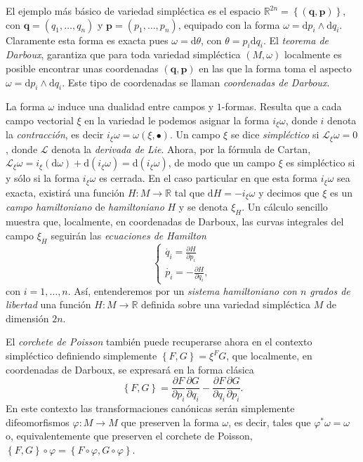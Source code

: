 \documentclass[12pt,a4paper,twoside]{article}
\theoremstyle{definition} \newtheorem{defn}[thm]{Definición}
\theoremstyle{definition} \newtheorem{ejemplo}[thm]{Ejemplo}
\theoremstyle{definition} \newtheorem{ejercicio}[thm]{Ejercicio}
\theoremstyle{remark} \newtheorem*{obs}{Observación}
\def\RR{\mathbb{R}}
\def\dd{\mathrm{d}}
\def\lie{\mathscr{L}}
\newcommand{\vect}[1]{\mathbf{#1}}
\newcommand{\parcial}[2]{\frac{\partial #1}{\partial #2}}
\begin{document}
El ejemplo más básico de variedad simpléctica es el espacio $\RR^{2n}=\left\{ (\vect{q},\vect{p}) \right\}$, con $\vect{q}=(q_1,\dots,q_n)$ y $\vect{p}=(p_1,\dots,p_n)$, equipado con la forma $\omega=\dd p_i \wedge \dd q_i$. Claramente esta forma es exacta pues $\omega=\dd \theta$, con $\theta=p_i \dd q_i$. El \emph{teorema de Darboux}, garantiza que para toda variedad simpléctica $(M,\omega)$ localmente es posible encontrar unas coordenadas $(\vect{q},\vect{p})$ en las que la forma toma el aspecto $\omega=\dd p_i \wedge \dd q_i$. Este tipo de coordenadas se llaman \emph{coordenadas de Darboux}.

La forma $\omega$ induce una dualidad entre campos y $1$-formas. Resulta que a cada campo vectorial $\xi$ en la variedad le podemos asignar la forma $i_{\xi}\omega$, donde $i$ denota la \emph{contracción}, es decir $i_{\xi}\omega=\omega(\xi,\bullet)$. Un campo $\xi$ se dice \emph{simpléctico} si $\lie_{\xi}\omega=0$, donde $\lie$ denota la \emph{derivada de Lie}. Ahora, por la fórmula de Cartan, $\lie_{\xi}\omega=i_{\xi}(\dd \omega)+\dd(i_{\xi}\omega)=\dd(i_{\xi}\omega)$, de modo que un campo $\xi$ es simpléctico si y sólo si la forma $i_{\xi}\omega$ es cerrada. En el caso particular en que esta forma $i_{\xi}\omega$ sea exacta, existirá una función $H:M\rightarrow \RR$ tal que $\dd H=-i_{\xi}\omega$ y decimos que $\xi$ es un \emph{campo hamiltoniano} de \emph{hamiltoniano} $H$ y se denota $\xi_H$. Un cálculo sencillo muestra que, localmente, en coordenadas de Darboux, las curvas integrales del campo $\xi_H$ seguirán las \emph{ecuaciones de Hamilton}
\begin{equation}
  \begin{cases}
    \dot{q_i}=\parcial{H}{p_i}\\ 
    \dot{p_i}=-\parcial{H}{q_i} ,
  \end{cases}
  \label{eq:hamilton}
\end{equation}
con $i=1,\dots,n$.
Así, entenderemos por un \emph{sistema hamiltoniano con $n$ grados de libertad} una función $H:M\rightarrow \RR$ definida sobre una variedad simpléctica $M$ de dimensión $2n$.

El  \emph{corchete de Poisson} también puede recuperarse ahora en el contexto simpléctico definiendo simplemente $\left\{ F,G \right\}=\xi^F G$, que localmente, en coordenadas de Darboux, se expresará en la forma clásica
\begin{equation}
  \left\{ F,G \right\}=\parcial{F}{p_i}\parcial{G}{q_i}-\parcial{F}{q_i}\parcial{G}{p_i}.
  \label{eq:poisson}
\end{equation}
En este contexto las transformaciones canónicas serán simplemente difeomorfismos $\varphi:M\rightarrow M$ que preserven la forma $\omega$, es decir, tales que $\varphi^*\omega=\omega$ o, equivalentemente que preserven el corchete de Poisson, $\left\{ F,G \right\}\circ \varphi=\left\{ F\circ \varphi,G\circ \varphi \right\}$.
\end{document}
